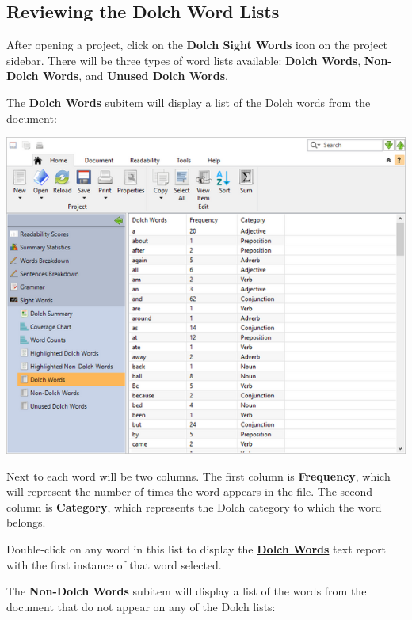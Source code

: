 \documentclass[
]{book}
\theoremstyle{definition}
\theoremstyle{definition}
\theoremstyle{definition}
\theoremstyle{definition}
\theoremstyle{remark}
\begin{document}
\hypertarget{reviewing-dolch-lists}{%
\subsection*{Reviewing the Dolch Word Lists}\label{reviewing-dolch-lists}}

After opening a project, click on the \textbf{Dolch Sight Words} icon on the project sidebar. There will be three types of word lists available: \textbf{Dolch Words}, \textbf{Non-Dolch Words}, and \textbf{Unused Dolch Words}.

The \textbf{Dolch Words} subitem will display a list of the Dolch words from the document:

\includegraphics{Images/dolchwordslist.png}

Next to each word will be two columns. The first column is \textbf{Frequency}, which will represent the number of times the word appears in the file. The second column is \textbf{Category}, which represents the Dolch category to which the word belongs.

Double-click on any word in this list to display the \protect\hyperlink{reviewing-dolch-text}{\textbf{Dolch Words}} text report with the first instance of that word selected.

The \textbf{Non-Dolch Words} subitem will display a list of the words from the document that do not appear on any of the Dolch lists:
\end{document}
